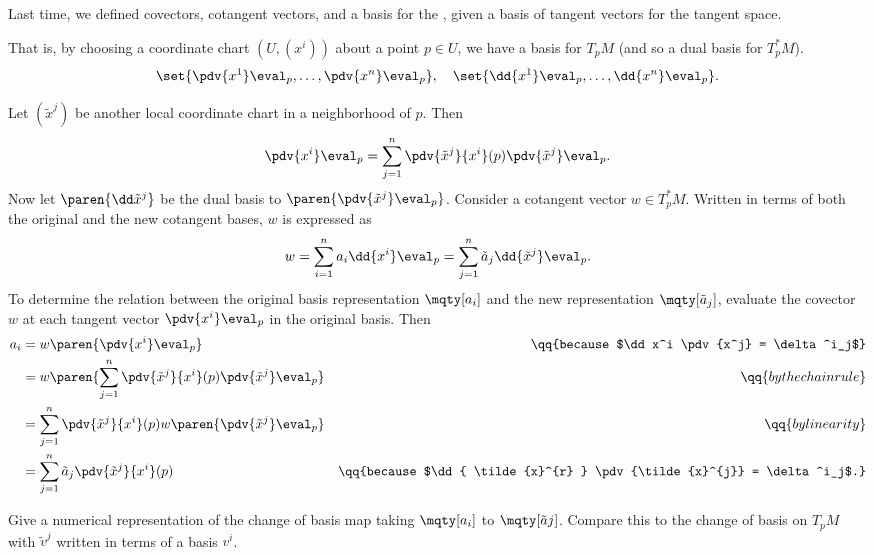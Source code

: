 \newcommand{\fake}[2]{\tilde{#1}^{#2}} 

Last time, we defined covectors, cotangent vectors, and a basis for the , given a basis of tangent vectors for the tangent space.

That is, by choosing a coordinate chart $(U, (x^{i}))$ about a point $p \in U$, we have a basis for $T_p M$ (and so a dual basis for $T^*_p M$).
\begin{align*}
      \set{ \pdv{x^1} \eval_p, \ldots, \pdv{x^n} \eval_p},
      \quad
      \set{\dd {x^1} \eval_p, \ldots, \dd {x^n} \eval_p}.
\end{align*}

\begin{ex}
   \label{changingcotangent}
    Let $(\fake x j)$ be another local coordinate chart in a neighborhood of $p$. Then
    \[
        \pdv{x^i} \eval_p = \sum^{n}_{j=1} \pdv{\fake x j}{x^i}(p) \pdv{\fake x j} \eval_p.
    \]
    Now let $\paren{ \dd \fake x j }$ be the dual basis to $\paren{ \pdv{\fake x j} \eval_p }$. Consider a cotangent vector $w \in T^*_pM$. Written in terms of both the original and the new cotangent bases, $w$ is expressed as
    \begin{equation*}
       w = \sum^{n}_{i=1} a_i \dd { x^i } \eval_p = \sum^{n}_{j=1} \tilde a_j \dd { \fake x j } \eval_p.
    \end{equation*}
    To determine the relation between the original basis representation $\mqty[a_i]$ and the new representation $\mqty[\tilde a_j]$, evaluate the covector $w$ at each tangent vector $\pdv{x^i} \eval_p$ in the original basis. Then
    \begin{align*}
       a_i &= w\paren{ \pdv{x^i} \eval_p} & \qq{because $\dd x^i \pdv{x^j} = \delta^i_j$} \\
           &= w \paren{ \sum^{n}_{j=1} \pdv{\fake x j}{x^i}(p) \pdv{\fake x j} \eval_p } & \qq{by the chain rule}\\
           &=  \sum^{n}_{j=1} \pdv{\fake x j}{x^i}(p) w \paren{ \pdv{\fake x j} \eval_p } & \qq{by linearity}\\
           &= \sum^{n}_{j=1} \tilde a_j \pdv{\fake x j}{x^i}(p) & \qq{because $\dd { \fake x r } \pdv{\fake x j} = \delta^i_j$.} \\    \end{align*}
\end{ex}

\begin{todo}[]
   Give a numerical representation of the change of basis map taking $\mqty[a_i]$ to $\mqty[\tilde a j]$. Compare this to the change of basis on $T_pM$ with $\fake v j$  written in terms of a basis $v^i$.
\end{todo}

